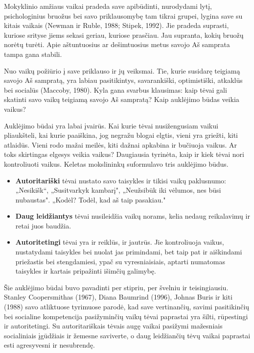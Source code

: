 \documentclass{article}
\begin{document}
Mokyklinio amžiaus vaikai pradeda save apibūdinti, nurodydami lytį,
psichologinius bruožus bei savo priklausomybę tam tikrai grupei, lygina save
su kitais vaikais (Newman ir Ruble, 1988; Stipek, 1992). Jie pradeda suprasti,
kuriose srityse jiems sekasi geriau, kuriose prasčiau. Jau supranta, kokių bruožų
norėtų turėti. Apie aštuntuosius ar dešimtuosius metus savojo Aš samprata tampa
gana stabili.

Nuo vaikų požiūrio į save priklauso ir jų veiksmai. Tie, kurie susidarę teigiamą
savojo Aš sampratą, yra labiau pasitikintys, savarankiški, optimistiški, atkaklūs
bei socialūs (Maccoby, 1980). Kyla gana svarbus klausimas: kaip tėvai gali skatinti
savo vaikų teigiamą savojo Aš sampratą? Kaip auklėjimo būdas veikia vaikus?

Auklėjimo būdai yra labai įvairūs. Kai kurie tėvai nusižengusiam vaikui pliaukšteli,
kai kurie paaiškina, jog negražu blogai elgtis, vieni yra griežti, kiti atlaidūs. Vieni rodo mažai meilės, kiti dažnai apkabina ir bučiuoja vaikus. Ar toks skirtingas elgesys veikia vaikus? Daugiausia tyrinėta, kaip ir kiek tėvai nori kontroliuoti vaikus. Keletas mokslininkų suformulavo tris auklėjimo būdus.

\begin{itemize}
\item \textbf{Autoritariški} tėvai nustato savo taisykles ir tikisi vaikų paklusnumo: „Nesikišk“,
„Susitvarkyk kambarį", „Neužsibūk iki vėlumos, nes būsi nubaustas".
„Kodėl? Todėl, kad aš taip pasakiau."
\item \textbf{Daug leidžiantys} tėvai nusileidžia vaikų norams, kelia nedaug reikalavimų ir
retai juos baudžia.
\item \textbf{Autoritetingi} tėvai yra ir reiklūs, ir jautrūs. Jie kontroliuoja vaikus, nustatydami
taisykles bei nuolat jas primindami, bet taip pat ir aiškindami priežastis
bei stengdamiesi, ypač su vyresniaisiais, aptarti numatomas taisykles ir kartais
pripažinti išimčių galimybę.
\end{itemize}

Šie auklėjimo būdai buvo pavadinti per stipriu, per švelniu ir teisingiausiu. Stanley Coopersmithas (1967), Diana Baumrind (1996), Johnas Buris ir kiti (1988) savo atliktuose tyrimuose parodė, kad save vertinančių, savimi pasitikinčių bei socialine kompetencija pasižyminčių vaikų tėvai paprastai yra šilti, rūpestingi ir autoritetingi. Su autoritariškais tėvais augę vaikai pasižymi mažesniais socialiniais įgūdžiais ir žemesne saviverte, o daug leidžiančių tėvų vaikai paprastai esti agresyvesni ir nesubrendę.
\end{document}
